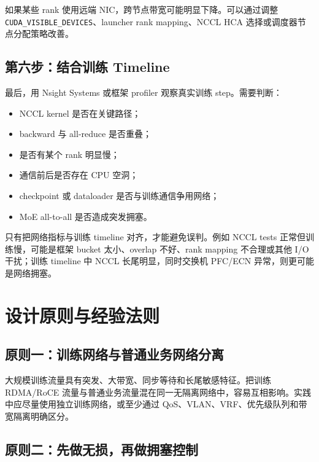 如果某些 rank 使用远端 NIC，跨节点带宽可能明显下降。可以通过调整 \texttt{CUDA\_VISIBLE\_DEVICES}、launcher rank mapping、NCCL HCA 选择或调度器节点分配策略改善。

\subsection{第六步：结合训练 Timeline}
\label{subsec:debug-training-timeline}

最后，用 Nsight Systems 或框架 profiler 观察真实训练 step。需要判断：

\begin{itemize}
  \item NCCL kernel 是否在关键路径；
  \item backward 与 all-reduce 是否重叠；
  \item 是否有某个 rank 明显慢；
  \item 通信前后是否存在 CPU 空洞；
  \item checkpoint 或 dataloader 是否与训练通信争用网络；
  \item MoE all-to-all 是否造成突发拥塞。
\end{itemize}

只有把网络指标与训练 timeline 对齐，才能避免误判。例如 NCCL tests 正常但训练慢，可能是框架 bucket 太小、overlap 不好、rank mapping 不合理或其他 I/O 干扰；训练 timeline 中 NCCL 长尾明显，同时交换机 PFC/ECN 异常，则更可能是网络拥塞。

\section{设计原则与经验法则}
\label{sec:rdma-roce-design-principles}

\subsection{原则一：训练网络与普通业务网络分离}
\label{subsec:principle-separate-network}

大规模训练流量具有突发、大带宽、同步等待和长尾敏感特征。把训练 RDMA/RoCE 流量与普通业务流量混在同一无隔离网络中，容易互相影响。实践中应尽量使用独立训练网络，或至少通过 QoS、VLAN、VRF、优先级队列和带宽隔离明确区分。

\subsection{原则二：先做无损，再做拥塞控制}
\label{subsec:principle-lossless-congestion}

